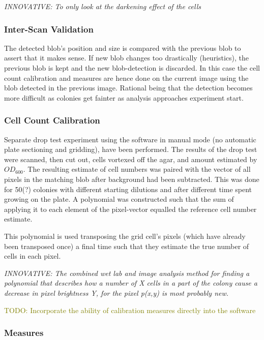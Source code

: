 \documentclass{article}
\newcommand{\todo}[1]{\textcolor{olive}{TODO: #1}}
\newcommand{\innovative}[1]{\emph{INNOVATIVE: #1}}
\begin{document}
\innovative{To only look at the darkening effect of the cells}

\subsubsection{Inter-Scan Validation}

The detected blob's position and size is compared with the previous blob
to assert that it makes sense.
If new blob changes too drastically (heuristics), the previous blob is kept
and the new blob-detection is discarded.
In this case the cell count calibration and measures are hence done on the 
current image using the blob detected in the previous image.
Rational being that the detection becomes more difficult as colonies get 
fainter as analysis approaches experiment start.

\subsubsection{Cell Count Calibration}

Separate drop test experiment using the software in manual mode (no automatic
plate sectioning and gridding), have been performed.
The results of the drop test were scanned, then cut out, cells vortexed off
the agar, and amount estimated by $OD_{600}$.
The resulting estimate of cell numbers was paired with the vector of all
pixels in the matching blob after background had been subtracted.
This was done for 50(?) colonies with different starting dilutions and after
different time spent growing on the plate.
A polynomial was constructed such that the sum of applying it to each element
of the pixel-vector equalled the reference cell number estimate.

This polynomial is used transposing the grid cell's pixels (which have 
already been transposed once) a final time such that they estimate the 
true number of cells in each pixel.

\innovative{The combined wet lab and image analysis method for finding 
a polynomial that describes how a number of X cells in a part of the 
colony cause a decrease in pixel brightness Y, for the pixel p(x,y) 
is most probably new.}

\todo{Incorporate the ability of calibration measures directly into the 
software}

\subsubsection{Measures}
\end{document}
